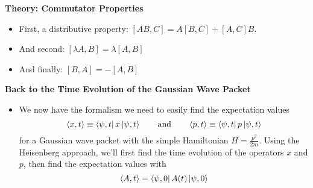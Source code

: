 \documentclass[11pt, a4paper]{article}
\newcommand{\eqtext}[1]{\qquad \text{#1} \qquad}
\begin{document}
\textbf{Theory: Commutator Properties}
\begin{itemize}
	\item First, a distributive property: $ [AB, C] = A[B, C] + [A, C]B $.
	
	\item And second: $ [\lambda A, B] = \lambda [A, B] $
	
	\item And  finally: $ [B, A] = -[A, B] $
\end{itemize}

\textbf{Back to the Time Evolution of the Gaussian Wave Packet}
\begin{itemize}
	\item We now have the formalism we need to easily find the expectation values
	\begin{equation*}
		\ev{x, t} \equiv \bra{\psi, t}x\ket{\psi, t} \eqtext{and} \ev{p, t} \equiv \bra{\psi, t}p\ket{\psi, t}
	\end{equation*}
	for a Gaussian wave packet with the simple Hamiltonian $ H = \frac{p^{2}}{2m} $. Using the Heisenberg approach, we'll first find the time evolution of the operators $ x $ and $ p $, then find the expectation values with
	\begin{equation*}
		\ev{A, t} = \bra{\psi, 0} A(t) \ket{\psi, 0}
	\end{equation*}
	

\end{itemize}
\end{document}
